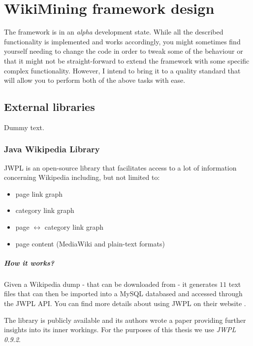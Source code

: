 \chapter{WikiMining framework design}

The framework is in an \emph{alpha} development state. While all the described
functionality is implemented and works accordingly, you might sometimes find
yourself needing to change the code in order to tweak some of the behaviour or
that it might not be straight-forward to extend the framework with some
specific complex functionality. However, I intend to bring it to a quality
standard that will allow you to perform both of the above tasks with ease.

\section{External libraries}

Dummy text.

\subsection{Java Wikipedia Library}

\ac{JWPL} is an open-source library that facilitates access to a lot of
information concerning Wikipedia including, but not limited to:
\begin{itemize}
  \item page link graph
  \item category link graph
  \item page \(\leftrightarrow\) category link graph
  \item page content (MediaWiki and plain-text formats)
\end{itemize}

\paragraph{How it works?} Given a Wikipedia dump - that can be downloaded from
 - it generates \(11\) text files that can
then be imported into a MySQL databased and accessed through the \ac{JWPL}
\ac{API}. You can find more details about using \ac{JWPL} on their website
.

The library is publicly available  and
its authors wrote a paper \cite{zesch2008jwpl} providing further insights into
its inner workings. For the purposes of this thesis we use \emph{\ac{JWPL}
0.9.2}.

